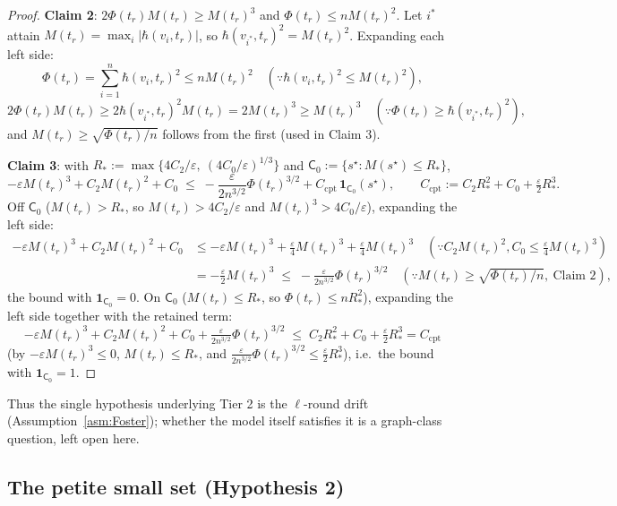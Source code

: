 \documentclass[11pt]{article}
\theoremstyle{definition}
\begin{document}
\begin{proof}
\smallskip\noindent\textbf{Claim 2}: $2\Phi(t_r)M(t_r) \geq M(t_r)^3$ and $\Phi(t_r) \leq nM(t_r)^2$. Let $i^\ast$ attain $M(t_r) = \max_i|\hbar(v_i, t_r)|$, so $\hbar(v_{i^\ast}, t_r)^2 = M(t_r)^2$. Expanding each left side:
\[
  \Phi(t_r) = \sum_{i=1}^n \hbar(v_i, t_r)^2 \leq nM(t_r)^2 \quad (\because \hbar(v_i, t_r)^2 \leq M(t_r)^2) ,
\]
\[
  2\Phi(t_r)M(t_r) \geq 2\hbar(v_{i^\ast}, t_r)^2 M(t_r) = 2M(t_r)^3 \geq M(t_r)^3 \quad (\because \Phi(t_r) \geq \hbar(v_{i^\ast}, t_r)^2) ,
\]
and $M(t_r) \geq \sqrt{\Phi(t_r)/n}$ follows from the first (used in Claim 3).

\smallskip\noindent\textbf{Claim 3}: with $R_* := \max\{4C_2/\varepsilon,\ (4C_0/\varepsilon)^{1/3}\}$ and $\mathsf{C}_0 := \{s^{\star} : M(s^{\star}) \leq R_*\}$,
\[
  -\varepsilon M(t_r)^3 + C_2 M(t_r)^2 + C_0 \;\leq\; -\frac{\varepsilon}{2n^{3/2}}\Phi(t_r)^{3/2} + C_{\mathrm{cpt}}\,\mathbf{1}_{\mathsf{C}_0}(s^{\star}), \qquad C_{\mathrm{cpt}} := C_2 R_*^2 + C_0 + \tfrac{\varepsilon}{2}R_*^3 .
\]
Off $\mathsf{C}_0$ ($M(t_r) > R_*$, so $M(t_r) > 4C_2/\varepsilon$ and $M(t_r)^3 > 4C_0/\varepsilon$), expanding the left side:
\begin{align*}
  -\varepsilon M(t_r)^3 + C_2 M(t_r)^2 + C_0
  &\leq -\varepsilon M(t_r)^3 + \tfrac{\varepsilon}{4}M(t_r)^3 + \tfrac{\varepsilon}{4}M(t_r)^3
     \quad (\because C_2 M(t_r)^2, C_0 \leq \tfrac{\varepsilon}{4}M(t_r)^3) \\
  &= -\tfrac{\varepsilon}{2}M(t_r)^3 \;\leq\; -\frac{\varepsilon}{2n^{3/2}}\Phi(t_r)^{3/2}
     \quad (\because M(t_r) \geq \sqrt{\Phi(t_r)/n},\ \text{Claim 2}) ,
\end{align*}
the bound with $\mathbf{1}_{\mathsf{C}_0} = 0$. On $\mathsf{C}_0$ ($M(t_r) \leq R_*$, so $\Phi(t_r) \leq nR_*^2$), expanding the left side together with the retained term:
\[
  -\varepsilon M(t_r)^3 + C_2 M(t_r)^2 + C_0 + \tfrac{\varepsilon}{2n^{3/2}}\Phi(t_r)^{3/2}
  \;\leq\; C_2 R_*^2 + C_0 + \tfrac{\varepsilon}{2}R_*^3 = C_{\mathrm{cpt}}
\]
(by $-\varepsilon M(t_r)^3 \leq 0$, $M(t_r) \leq R_*$, and $\tfrac{\varepsilon}{2n^{3/2}}\Phi(t_r)^{3/2} \leq \tfrac{\varepsilon}{2}R_*^3$), i.e.\ the bound with $\mathbf{1}_{\mathsf{C}_0} = 1$.
\end{proof}



Thus the single hypothesis underlying Tier 2 is the $\ell$-round drift (Assumption~\ref{asm:Foster}); whether the model itself satisfies it is a graph-class question, left open here.

\subsection{The petite small set (Hypothesis 2)}
\label{sub:minor}
\end{document}
